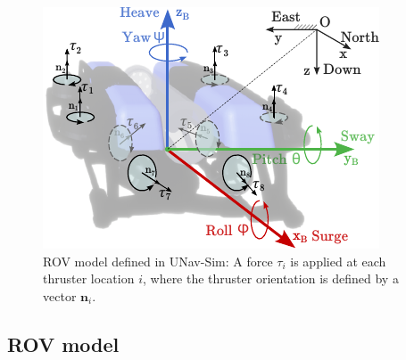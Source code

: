 
\begin{figure}[!t]
    \centering
    \includegraphics[width=\columnwidth]{figures/bluerov_fbd.pdf}
    \caption{ROV model defined in UNav-Sim: A force $\tau_i$ is applied at each thruster location $i$, where the thruster orientation is defined by a vector $\textbf{n}_i$.}
    \label{fig:rov_fbd}
\end{figure}

\subsection{ROV model }




